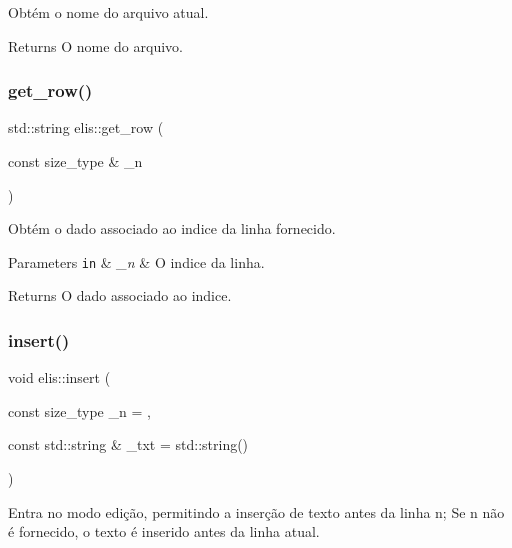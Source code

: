 Obtém o nome do arquivo atual. 

\begin{DoxyReturn}{Returns}
O nome do arquivo. 
\end{DoxyReturn}
\mbox{\label{classelis_a9dd72229bed65be90429180f7259d129}} 
\subsubsection{\texorpdfstring{get\+\_\+row()}{get\_row()}}
{\footnotesize\ttfamily std\+::string elis\+::get\+\_\+row (\begin{DoxyParamCaption}\item[{const size\+\_\+type \&}]{\+\_\+n }\end{DoxyParamCaption})\hspace{0.3cm}{\ttfamily [inline]}}



Obtém o dado associado ao indice da linha fornecido. 


\begin{DoxyParams}[1]{Parameters}
\mbox{\tt in}  & {\em \+\_\+n} & O indice da linha.\\
\hline
\end{DoxyParams}
\begin{DoxyReturn}{Returns}
O dado associado ao indice. 
\end{DoxyReturn}
\mbox{\label{classelis_aa35b724716a8e628fa030d7c67978338}} 
\subsubsection{\texorpdfstring{insert()}{insert()}}
{\footnotesize\ttfamily void elis\+::insert (\begin{DoxyParamCaption}\item[{const size\+\_\+type}]{\+\_\+n = {},  }\item[{const std\+::string \&}]{\+\_\+txt = {\ttfamily std\+:\+:string()} }\end{DoxyParamCaption})}



Entra no modo edição, permitindo a inserção de texto antes da linha n; Se n não é fornecido, o texto é inserido antes da linha atual. 


